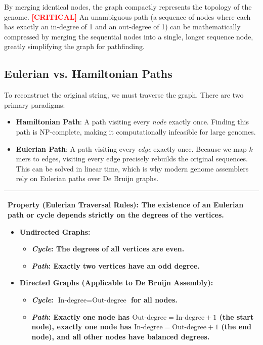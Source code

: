 \documentclass[11pt,a4paper]{article}
\newenvironment{important}
    {\vspace{1em}\noindent\begin{tabular}{|p{0.97\textwidth}|}\hline\vspace{0.1em}}
    {\vspace{0.1em}\\\hline\end{tabular}\vspace{1em}}
\newcommand{\sta}{\textbf{\textcolor{red}{[CRITICAL]}} }
\begin{document}
\begin{center}
\end{center}

By merging identical nodes, the graph compactly represents the topology of the genome. \sta An unambiguous path (a sequence of nodes where each has exactly an in-degree of 1 and an out-degree of 1) can be mathematically compressed by merging the sequential nodes into a single, longer sequence node, greatly simplifying the graph for pathfinding.

\subsection{Eulerian vs. Hamiltonian Paths}
To reconstruct the original string, we must traverse the graph. There are two primary paradigms:
\begin{itemize}
    \item \textbf{Hamiltonian Path}: A path visiting every \textit{node} exactly once. Finding this path is NP-complete, making it computationally infeasible for large genomes.
    \item \textbf{Eulerian Path}: A path visiting every \textit{edge} exactly once. Because we map $k$-mers to edges, visiting every edge precisely rebuilds the original sequences. This can be solved in linear time, which is why modern genome assemblers rely on Eulerian paths over De Bruijn graphs.
\end{itemize}

\begin{important}
\textbf{Property (Eulerian Traversal Rules):} The existence of an Eulerian path or cycle depends strictly on the degrees of the vertices.
\begin{itemize}
    \item \textbf{Undirected Graphs}: 
        \begin{itemize}
            \item \textit{Cycle}: The degrees of all vertices are even.
            \item \textit{Path}: Exactly two vertices have an odd degree.
        \end{itemize}
    \item \textbf{Directed Graphs} (Applicable to De Bruijn Assembly):
        \begin{itemize}
            \item \textit{Cycle}: $\text{In-degree} = \text{Out-degree}$ for all nodes.
            \item \textit{Path}: Exactly one node has $\text{Out-degree} = \text{In-degree} + 1$ (the start node), exactly one node has $\text{In-degree} = \text{Out-degree} + 1$ (the end node), and all other nodes have balanced degrees.
        \end{itemize}
\end{itemize}
\end{important}
\end{document}
